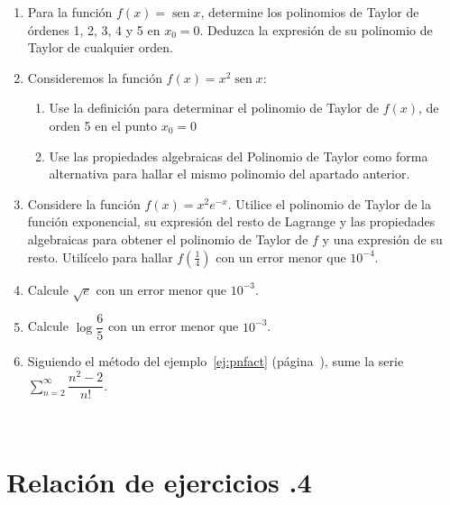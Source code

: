 \begin{enumerate}
\item
Para la función $f(x)=\operatorname{sen} x$, determine los polinomios de Taylor de órdenes 1, 2, 3, 4 y 5 en $x_0=0$. Deduzca la expresión de su polinomio de Taylor de cualquier orden.

\item
Consideremos la función $f(x)=x^2\operatorname{sen} x$:
\begin{enumerate}
\item
Use la definición para determinar el polinomio de Taylor de $f(x)$, de orden 5 en el punto $x_0=0$
\item
Use las propiedades algebraicas del Polinomio de Taylor como forma alternativa para hallar el mismo polinomio del apartado anterior.
\end{enumerate}

\newpage
\item
Considere la función $f(x)=x^2e^{-x}$.
Utilice el polinomio de Taylor de la función exponencial, su expresión del resto de Lagrange y las propiedades algebraicas para obtener el polinomio de Taylor de $f$ y una expresión de su resto.
Utilícelo para hallar $f(\frac{1}{4})$ con un error menor que $10^{-4}$.



\item
Calcule $\sqrt{e}$ con un error menor que $10^{-3}$.

\item
Calcule $\log \dfrac65$ con un error menor que $10^{-3}$.



\item
Siguiendo el método del ejemplo~\ref{ej:pnfact}
(página~\pageref{ej:pnfact}), sume la serie $\displaystyle\sum_{n=2}^\infty   \dfrac{n^2-2}{n!}$.

\end{enumerate}


\thispagestyle{empty}
\ \newpage
\section*{Relación de ejercicios \thechapter.4}

\pagestyle{relaciones}

